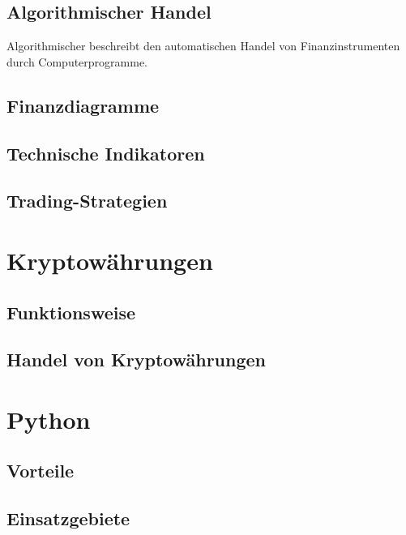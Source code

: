 \documentclass[oneside]{ausarbeitung}
\begin{document}
\subsection{Algorithmischer Handel}
\label{sub:algorithmischer_handel}

Algorithmischer beschreibt den automatischen Handel von Finanzinstrumenten durch Computerprogramme.

\subsection{Finanzdiagramme}
\label{sub:finanzdiagramme}

\subsection{Technische Indikatoren}
\label{sub:technische_Indikatoren}

\subsection{Trading-Strategien}
\label{sub:trading_strategien}


\section{Kryptowährungen}
\label{sec:kryptowährungen}

\subsection{Funktionsweise}
\label{sub:blockchain}

\subsection{Handel von Kryptowährungen}
\label{sub:handel_von_kryptowährungen}


\section{Python}
\label{sec:python}

\subsection{Vorteile}
\label{sub:vorteile}

\subsection{Einsatzgebiete}
\label{sub:einsatzgebiete}
\end{document}
